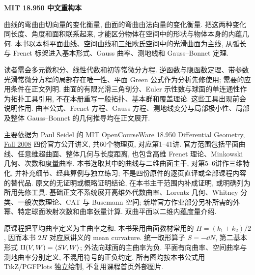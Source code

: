 \frontmatter
\begin{center}
{\color{structurecolor}\bfseries\fontsize{18}{25}\selectfont\BookTitle\par}
{\bfseries MIT 18.950 中文重构本\par}
\BookAuthor\par
\BookDate\par
\end{center}

\originalpreface
{}
曲线的弯曲由切向量的变化衡量, 曲面的弯曲由法向量的变化衡量. 把这两种变化同长度、角度和面积联系起来, 才能区分物体在空间中的形状与物体本身的内蕴几何. 本书以本科平面曲线、空间曲线和三维欧氏空间中的光滑曲面为主线, 从弧长与 Frenet 标架进入基本形式、Gauss 曲率、测地线和 Gauss--Bonnet 定理.

读者需会多元微积分、线性代数和初等常微分方程. 逆函数与隐函数定理、带参数光滑常微分方程的局部存在唯一性、平面 Green 公式作为分析先修使用; 需要的应用条件在正文列明. 曲面的有限光滑三角剖分、Euler 示性数与球面的单连通性作为拓扑工具引用, 不在本册重写一般拓扑、基本群和覆盖理论. 这些工具出现前会说明作用. 曲率公式、Frenet 方程、Gauss 方程、测地线变分与局部极小性、局部及整体 Gauss--Bonnet 的几何推导均在正文展开.

主要依据为 Paul Seidel 的 \href{https://ocw.mit.edu/courses/18-950-differential-geometry-fall-2008/pages/lecture-notes/}{MIT OpenCourseWare 18.950 Differential Geometry, Fall 2008} 四份官方公开讲义, 共60个物理页, 对应第1--41讲. 官方范围包括平面曲线、任意维超曲面、整体几何与长度距离, 也包含高维 Frenet 理论、Minkowski 几何、次数和度量曲率. 本书选取其中的曲线与二维曲面主干, 对第5--6讲作三维特化, 并补充细节、经典算例与独立练习; 不是四份原件的逐页直译或全部课程内容的替代品. 原文的无证明或概略证明结论, 在本书主干范围内补成证明, 或明确列为所用先修工具. 基础正文不系统展开高维外代数曲率、Lorentz 几何、Whitney 分类、一般次数理论、CAT 与 Busemann 空间; 新增官方作业部分另补所需的外幂、特定球面映射次数和曲率张量计算. 双曲平面以二维内蕴度量介绍.

原课程把平均曲率定义为主曲率之和. 本书采用曲面教材常用的 $H=(k_1+k_2)/2$, 因而本书 $2H$ 对应原讲义的 mean curvature. 统一取形算子 $S=-\dd N$, 第二基本形式 $\mathrm{II}(V,W)=\langle SV,W\rangle$; 外法向球面的主曲率为负. 平面有向曲率、空间曲率与测地曲率分别定义, 不混用符号的正负约定. 所有图均按本书公式用 TikZ/PGFPlots 独立绘制, 不复用课程首页外部图片.

